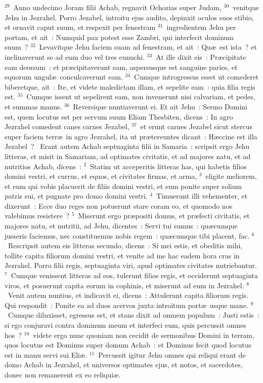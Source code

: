${}^{29}$~Anno undecimo Joram filii Achab, regnavit Ochozias super Judam,
${}^{30}$~venitque Jehu in Jezrahel. Porro Jezabel, introitu ejus audito, depinxit oculos suos stibio, et ornavit caput suum, et respexit per fenestram
${}^{31}$~ingredientem Jehu per portam, et ait~: Numquid pax potest esse Zambri, qui interfecit dominum suum~?
${}^{32}$~Levavitque Jehu faciem suam ad fenestram, et ait~: Qu\ae\ est ista~? et inclinaverunt se ad eum duo vel tres eunuchi.
${}^{33}$~At ille dixit eis~: Pr\ae cipitate eam deorsum~: et pr\ae cipitaverunt eam, aspersusque est sanguine paries, et equorum ungul\ae\ conculcaverunt eam.
${}^{34}$~Cumque introgressus esset ut comederet biberetque, ait~: Ite, et videte maledictam illam, et sepelite eam~: quia filia regis est.
${}^{35}$~Cumque issent ut sepelirent eam, non invenerunt nisi calvariam, et pedes, et summas manus.
${}^{36}$~Reversique nuntiaverunt ei. Et ait Jehu~: Sermo Domini est, quem locutus est per servum suum Eliam Thesbiten, dicens~: In agro Jezrahel comedent canes carnes Jezabel,
${}^{37}$~et erunt carnes Jezabel sicut stercus super faciem terr\ae\ in agro Jezrahel, ita ut pr\ae tereuntes dicant~: H\ae ccine est illa Jezabel~?
~Erant autem Achab septuaginta filii in Samaria~: scripsit ergo Jehu litteras, et misit in Samariam, ad optimates civitatis, et ad majores natu, et ad nutritios Achab, dicens~:
${}^{2}$~Statim ut acceperitis litteras has, qui habetis filios domini vestri, et currus, et equos, et civitates firmas, et arma,
${}^{3}$~eligite meliorem, et eum qui vobis placuerit de filiis domini vestri, et eum ponite super solium patris sui, et pugnate pro domo domini vestri.
${}^{4}$~Timuerunt illi vehementer, et dixerunt~: Ecce duo reges non potuerunt stare coram eo, et quomodo nos valebimus resistere~?
${}^{5}$~Miserunt ergo pr\ae positi domus, et pr\ae fecti civitatis, et majores natu, et nutritii, ad Jehu, dicentes~: Servi tui sumus~: qu\ae cumque jusseris faciemus, nec constituemus nobis regem~: qu\ae cumque tibi placent, fac.
${}^{6}$~Rescripsit autem eis litteras secundo, dicens~: Si mei estis, et obeditis mihi, tollite capita filiorum domini vestri, et venite ad me hac eadem hora cras in Jezrahel. Porro filii regis, septuaginta viri, apud optimates civitates nutriebantur.
${}^{7}$~Cumque venissent litteras ad eos, tulerunt filios regis, et occiderunt septuaginta viros, et posuerunt capita eorum in cophinis, et miserunt ad eum in Jezrahel.
${}^{8}$~Venit autem nuntius, et indicavit ei, dicens~: Attulerunt capita filiorum regis. Qui respondit~: Ponite ea ad duos acervos juxta introitum port\ae\ usque mane.
${}^{9}$~Cumque diluxisset, egressus est, et stans dixit ad omnem populum~: Justi estis~: si ego conjuravi contra dominum meum et interfeci eum, quis percussit omnes hos~?
${}^{10}$~videte ergo nunc quoniam non cecidit de sermonibus Domini in terram, quos locutus est Dominus super domum Achab~: et Dominus fecit quod locutus est in manu servi sui Eli\ae .
${}^{11}$~Percussit igitur Jehu omnes qui reliqui erant de domo Achab in Jezrahel, et universos optimates ejus, et notos, et sacerdotes, donec non remanerent ex eo reliqui\ae .


